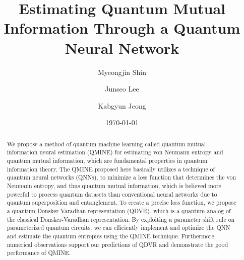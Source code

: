 \documentclass[aps,groupedaddress,superscriptaddress,amssymb,amsmath,amsbsy,amsfonts,twocolumn,pra]{revtex4}
\begin{document}
\newcommand*{\cl}[1]{{\mathcal{#1}}}
\newcommand*{\bb}[1]{{\mathbb{#1}}}
\newcommand{\ket}[1]{|#1\rangle}
\newcommand{\bra}[1]{\langle#1|}
\newcommand{\inn}[2]{\langle#1|#2\rangle}
\newcommand{\proj}[2]{| #1 \rangle\!\langle #2 |}
\newcommand*{\tn}[1]{{\textnormal{#1}}}
\newcommand*{\1}{{\mathbb{1}}}
\newcommand{\T}{\mbox{$\textnormal{Tr}$}}
\newcommand*{\todo}[1]{\textcolor[rgb]{0.99,0.1,0.3}{#1}}

\theoremstyle{plain}
\newtheorem{prop}{Proposition}
\newtheorem{proposition}{Proposition}
\newtheorem{theorem}{Theorem}
\newtheorem{lemma}[theorem]{Lemma}
\newtheorem{remark}{Remark}

\theoremstyle{definition}
\newtheorem{definition}{Definition}

\title{Estimating Quantum Mutual Information Through a Quantum Neural Network}
\author{Myeongjin Shin}

\author{Junseo Lee}

\author{Kabgyun Jeong}


\date{\today}

\begin{abstract}
We propose a method of quantum machine learning called quantum mutual information neural estimation (QMINE) for estimating von Neumann entropy and quantum mutual information, which are fundamental properties in quantum information theory. The QMINE proposed here basically utilizes a technique of quantum neural networks (QNNs), to minimize a loss function that determines the von Neumann entropy, and thus quantum mutual information, which is believed more powerful to process quantum datasets than conventional neural networks due to quantum superposition and entanglement. To create a precise loss function, we propose a quantum Donsker-Varadhan representation (QDVR), which is a quantum analog of the classical Donsker-Varadhan representation. By exploiting a parameter shift rule on parameterized quantum circuits, we can efficiently implement and optimize the QNN and estimate the quantum entropies using the QMINE technique. Furthermore, numerical observations support our predictions of QDVR and demonstrate the good performance of QMINE.
\end{abstract}
\end{document}
